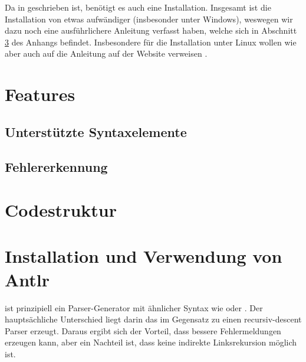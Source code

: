 Da  in  geschrieben ist, benötigt es auch eine  Installation. Insgesamt ist die Installation von  etwas aufwändiger (insbesonder unter Windows), weswegen wir dazu noch eine ausführlichere Anleitung verfasst haben, welche sich in Abschnitt \ref{Antlr} des Anhangs befindet. Insbesondere für die Installation unter Linux wollen wie aber auch auf die Anleitung auf der  Website verweisen \cite{antlr}.





\section{Features} \label{features}

\subsection{Unterstützte Syntaxelemente}

\subsection{Fehlererkennung}




\section{Codestruktur}

\appendix
\newpage



\newpage

\section{Installation und Verwendung von Antlr} \label{Antlr}

 ist prinzipiell ein Parser-Generator mit ähnlicher Syntax wie  oder . Der hauptsächliche Unterschied liegt darin das im Gegensatz zu  einen recursiv-descent Parser erzeugt. Daraus ergibt sich der Vorteil, dass  bessere Fehlermeldungen erzeugen kann, aber ein Nachteil ist, dass keine indirekte Linksrekursion möglich ist.


